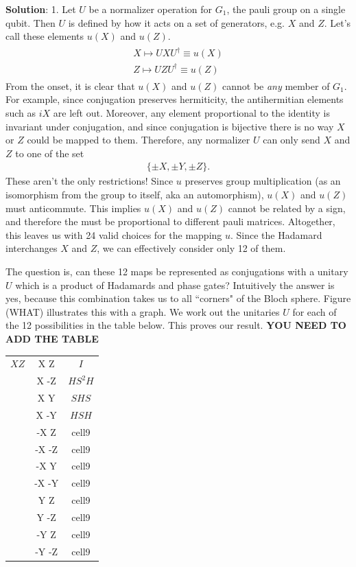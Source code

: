 \documentclass{book}
\begin{document}
    \textbf{Solution}: 1. Let $U$ be a normalizer operation for $G_1$, the pauli group on a single qubit. Then $U$ is defined by how it acts on a set of generators, e.g. $X$ and $Z$. Let's call these elements $u(X)$ and $u(Z)$.
    \begin{align}
    \begin{aligned}
        X \mapsto UXU^\dagger \equiv u(X) \\
        Z \mapsto UZU^\dagger \equiv u(Z)
    \end{aligned}
    \end{align}
    From the onset, it is clear that $u(X)$ and $u(Z)$ cannot be \emph{any} member of $G_1$. For example, since conjugation preserves hermiticity, the antihermitian elements such as $i X$ are left out. Moreover, any element proportional to the identity is invariant under conjugation, and since conjugation is bijective there is no way $X$ or $Z$ could be mapped to them. Therefore, any normalizer $U$ can only send $X$ and $Z$ to one of the set
    \begin{align}
        \{\pm X, \pm Y, \pm Z\}. 
    \end{align}
    These aren't the only restrictions! Since $u$ preserves group multiplication (as an isomorphism from the group to itself, aka an automorphism), $u(X)$ and $u(Z)$ must anticommute. This implies $u(X)$ and $u(Z)$ cannot be related by a sign, and therefore the must be proportional to different pauli matrices. Altogether, this leaves us with 24 valid choices for the mapping $u$. Since the Hadamard interchanges $X$ and $Z$, we can effectively consider only 12 of them. 
    
    The question is, can these 12 maps be represented as conjugations with a unitary $U$ which is a product of Hadamards and phase gates? Intuitively the answer is yes, because this combination takes us to all ``corners" of the Bloch sphere. Figure (WHAT) illustrates this with a graph. We work out the unitaries $U$ for each of the 12 possibilities in the table below. This proves our result. \textbf{YOU NEED TO ADD THE TABLE}
    
    \begin{center}
    \begin{tabular}{ |c|c|c| } 
    \hline
        $X Z$& X Z & $I$ \\ 
        & X -Z & $HS^2H$ \\ 
        & X Y & $SHS$ \\
        & X -Y & $HSH$ \\
        & -X Z & cell9 \\
        & -X -Z & cell9 \\
        & -X Y & cell9 \\
        & -X -Y & cell9 \\
        & Y Z & cell9 \\
        & Y -Z & cell9 \\
        & -Y Z & cell9 \\
        & -Y -Z & cell9 \\
    \hline
    \end{tabular}
    \end{center}
    
\end{document}
